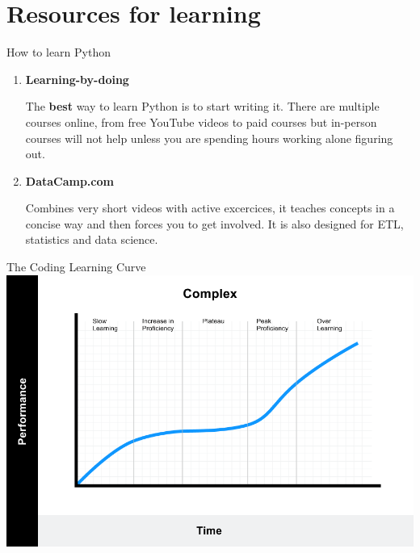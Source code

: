 \documentclass[aspectratio=169]{beamer}
\begin{document}
\section{Resources for learning}

\begin{frame}{How to learn Python}

\begin{enumerate}

\item \textbf{Learning-by-doing}

		The \textbf{best} way to learn Python is to start writing it. There are multiple courses online, from free YouTube videos to paid courses but in-person courses will not help unless you are spending hours working alone figuring out.
		
\item \textbf{DataCamp.com}
	
		Combines very short videos with active excercices, it teaches concepts in a concise way and then forces you to get involved. It is also designed for ETL, statistics and data science. 
	
\end{enumerate}
\end{frame}

\begin{frame}{The Coding Learning Curve}
\centering
\includegraphics[width=0.7\linewidth]{graphics/complex-lc.png}
	
\end{frame}
\end{document}

